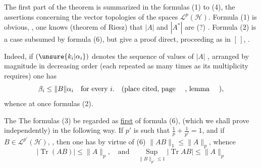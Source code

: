 The first part of the theorem is summarized in the
formulas (1) to (4),   the assertions concerning
the vector topologies of the spaces $\mathcal L^p(\mathcal H)$.
Formula (1) is obvious,  
 , one knows (theorem
of Riesz) that $|A|$ and $|A^*|$ are  
(?) . Formula (2) is a case
subsumed by formula (6), but  
give a proof 
direct, proceeding as in $[\,]$, .

Indeed, if $(\unsure{k_i|\alpha_i})$  denotes the
sequence of values of  $|A|$
 ,
arranged by magnitude
in decreasing order (each repeated as many times
as its multiplicity requires) one has
\[
\beta_i\leq\|B\|\alpha_i\quad\text{for every }i.\quad(\text{place cited, page \quad, lemma \quad}),
\]
whence at once formulas (2).

The 
The formulas (3)   be regarded  as
\uline{first} 
 of formula (6), (which we shall prove independently) in the
following way. If $p'$ is such that $\frac{1}{p}+\frac{1}{p'}=1$,
and if $B\in\mathcal L^{p'}(\mathcal H)$, 
, then
one has by virtue of (6) $\|AB\|_1\leq\|A\|_p$, whence
\[
|\operatorname{Tr}(AB)|\leq\|A\|_p,\quad\text{and}\quad
\operatorname*{Sup}_{\|B\|_{p'}\leq1}|\operatorname{Tr}AB|\leq\|A\|_p
\]
